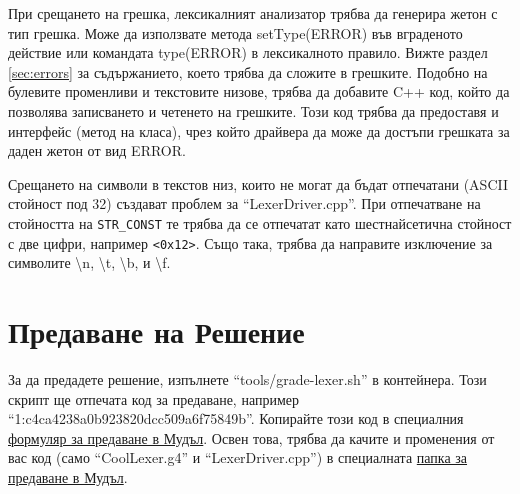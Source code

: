 \documentclass[11pt]{article}
\begin{document}
При срещането на грешка, лексикалният анализатор трябва да генерира жетон с тип грешка.
Може да използвате метода setType(ERROR) във вграденото действие или командата type(ERROR) в лексикалното правило.
Вижте раздел \ref{sec:errors} за съдържанието, което трябва да сложите в грешките.
Подобно на булевите променливи и текстовите низове, трябва да добавите C++ код, който да позволява записването и четенето на грешките.
Този код трябва да предоставя и интерфейс (метод на класа), чрез който драйвера да може да достъпи грешката за даден жетон от вид ERROR.

Срещането на символи в текстов низ, които не могат да бъдат отпечатани (ASCII стойност под 32) създават проблем за ``LexerDriver.cpp''.
При отпечатване на стойността на \texttt{STR\_CONST} те трябва да се отпечатат като шестнайсетична стойност с две цифри, например \texttt{<0x12>}.
Също така, трябва да направите изключение за символите \textbackslash n, \textbackslash t, \textbackslash b, и \textbackslash f.

\section{Предаване на Решение}

За да предадете решение, изпълнете ``tools/grade-lexer.sh'' в контейнера.
Този скрипт ще отпечата код за предаване, например ``1:c4ca4238a0b923820dcc509a6f75849b''.
Копирайте този код в специалния \href{https://learn.fmi.uni-sofia.bg/mod/quiz/view.php?id=358624}{формуляр за предаване в Мудъл}.
Освен това, трябва да качите и променения от вас код (само ``CoolLexer.g4'' и ``LexerDriver.cpp'') в специалната \href{https://learn.fmi.uni-sofia.bg/mod/publication/view.php?id=359465}{папка за предаване в Мудъл}.

\renewcommand{\notesname}{Бележки от Текста}
\theendnotes
\end{document}
